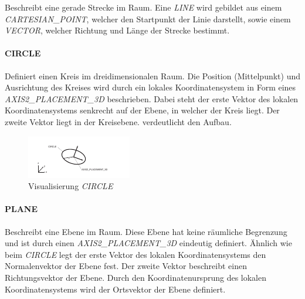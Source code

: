 Beschreibt eine gerade Strecke im Raum. Eine \textit{LINE} wird gebildet aus einem \textit{CARTESIAN\_POINT}, welcher den Startpunkt der Linie darstellt, sowie einem \textit{VECTOR}, welcher Richtung und Länge der Strecke bestimmt. 

\paragraph{CIRCLE}

Definiert einen Kreis im dreidimensionalen Raum. Die Position (Mittelpunkt) und Ausrichtung des Kreises wird durch ein lokales Koordinatensystem in Form eines \textit{AXIS2\_PLACE\-MENT\_3D} beschrieben. Dabei steht der erste Vektor des lokalen Koordinatensystems senkrecht auf der Ebene, in welcher der Kreis liegt. Der zweite Vektor liegt in der Kreisebene.  verdeutlicht den Aufbau. 

\begin{figure}[h]
	\centering
	
	\includegraphics[width=\linewidth]{img/circle_entity.pdf}
	
	\caption{Visualisierung \textit{CIRCLE}}
	\label{fig:circleentity}
\end{figure} 

\paragraph{PLANE}

Beschreibt eine Ebene im Raum. Diese Ebene hat keine räumliche Begrenzung und ist durch einen \textit{AXIS2\_PLACEMENT\_3D} eindeutig definiert. Ähnlich wie beim \textit{CIRCLE} legt der erste Vektor des lokalen Koordinatensystems den Normalenvektor der Ebene fest. Der zweite Vektor beschreibt einen Richtungsvektor der Ebene. Durch den Koordinatenursprung des lokalen Koordinatensystems wird der Ortsvektor der Ebene definiert. 


